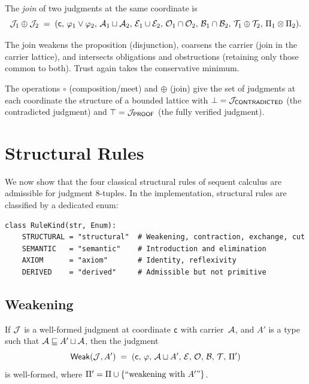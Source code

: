\documentclass[11pt]{article}
\begin{document}
\begin{definition}
The \emph{join} of two judgments at the same coordinate is
\[
  \mathcal{J}_1 \oplus \mathcal{J}_2 \;=\;
  (\mathsf{c},\,\varphi_1 \vee \varphi_2,\,\mathcal{A}_1 \sqcup \mathcal{A}_2,\,\mathcal{E}_1 \cup \mathcal{E}_2,\,\mathcal{O}_1 \cap \mathcal{O}_2,\,\mathcal{B}_1 \cap \mathcal{B}_2,\,\mathcal{T}_1 \oplus \mathcal{T}_2,\,\Pi_1 \otimes \Pi_2).
\]
\end{definition}

The join weakens the proposition (disjunction), coarsens the carrier
(join in the carrier lattice), and intersects obligations and obstructions
(retaining only those common to both).
Trust again takes the conservative minimum.

\begin{proposition}
The operations $\circ$ (composition/meet) and $\oplus$ (join) give the
set of judgments at each coordinate the structure of a bounded lattice
with $\bot = \mathcal{J}_{\mathsf{CONTRADICTED}}$ (the contradicted judgment) and
$\top = \mathcal{J}_{\mathsf{PROOF}}$ (the fully verified judgment).
\end{proposition}


\section{Structural Rules}\label{sec:structural}

We now show that the four classical structural rules of sequent calculus
are admissible for judgment 8-tuples.  In the implementation, structural
rules are classified by a dedicated enum:

\begin{lstlisting}[caption={Rule classification (from \texttt{models.py}).}]
class RuleKind(str, Enum):
    STRUCTURAL = "structural"  # Weakening, contraction, exchange, cut
    SEMANTIC   = "semantic"    # Introduction and elimination
    AXIOM      = "axiom"       # Identity, reflexivity
    DERIVED    = "derived"     # Admissible but not primitive
\end{lstlisting}

\subsection{Weakening}

\begin{definition}[Weakening]
If $\mathcal{J}$ is a well-formed judgment at coordinate $\mathsf{c}$ with
carrier~$\mathcal{A}$, and $A'$ is a type such that
$\mathcal{A} \sqsubseteq A' \sqcup \mathcal{A}$, then the judgment
\[
  \mathsf{Weak}(\mathcal{J}, A') \;=\;
  (\mathsf{c},\,\varphi,\,\mathcal{A} \sqcup A',\,\mathcal{E},\,\mathcal{O},\,\mathcal{B},\,\mathcal{T},\,\Pi')
\]
is well-formed, where $\Pi' = \Pi \cup \{\text{``weakening with } A'\text{''}\}$.
\end{definition}
\end{document}
